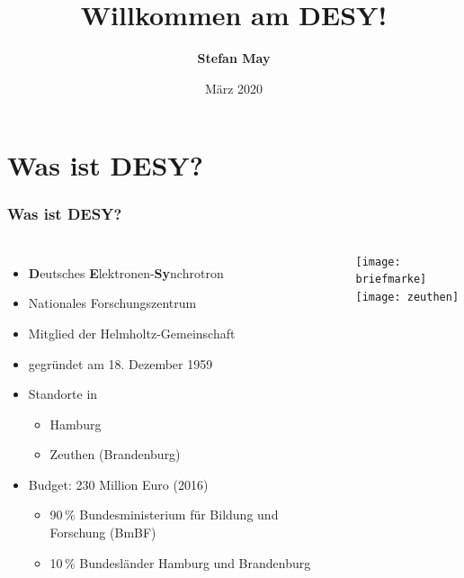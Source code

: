 \documentclass[10pt,t]{beamer}
\title[Willkommen am DESY]{Willkommen am DESY!}
\author[Stefan May]{\textbf{Stefan May}}
\institute{Softwareentwickler und Strahlenschutzbeauftragter\\Gruppe MPS (Maschine Personensicherheit)\\[\baselineskip]Einführungsvortrag}
\date[März 2020]{März 2020}
\begin{document}
\maketitle

\section{Was ist DESY?}

\begin{frame}
\frametitle{Was ist DESY?}
\vspace*{-2\baselineskip}
\begin{columns}[c]
\begin{itemize}
    \item \textbf{D}eutsches \textbf{E}lektronen-\textbf{Sy}nchrotron
    \item Nationales Forschungszentrum
    \item Mitglied der Helmholtz-Gemeinschaft
    \item gegründet am 18. Dezember 1959
    \item Standorte in
    \begin{itemize}
        \item Hamburg
        \item Zeuthen (Brandenburg)
    \end{itemize}
    \item Budget: 230 Million Euro (2016)
    \begin{itemize}
        \item 90\,\% Bundesministerium für Bildung und Forschung (BmBF)
        \item 10\,\% Bundesländer Hamburg und Brandenburg
    \end{itemize}
\end{itemize}
    \texttt{[image: briefmarke]} \\[1ex]
    \texttt{[image: zeuthen]}
\end{columns}
\end{frame}
\end{document}
